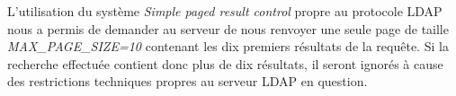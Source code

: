 \begin{figure}[h!]
  \label{fig:simple_paged_results}
  \center
  \setlength\fboxsep{5pt}
  \setlength\fboxrule{0.5pt}
\end{figure}


L'utilisation du système \emph{Simple paged result control} propre au protocole LDAP nous a permis de demander au serveur de nous renvoyer une seule page de taille \textit{MAX\_PAGE\_SIZE=10} contenant les dix premiers résultats de la requête. Si la recherche effectuée contient donc plus de dix résultats, il seront ignorés à cause des restrictions techniques propres au serveur LDAP en question.